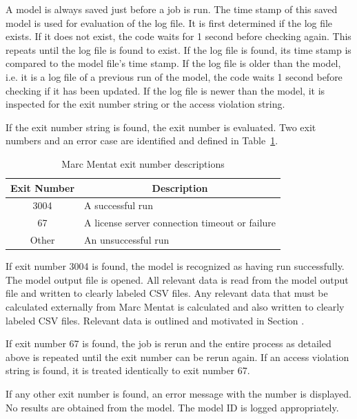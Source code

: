 A model is always saved just before a job is run. The time stamp of this saved model is used for evaluation of the log file. It is first determined if the log file exists. If it does not exist, the code waits for 1 second before checking again. This repeats until the log file is found to exist. If the log file is found, its time stamp is compared to the model file's time stamp. If the log file is older than the model, i.e. it is a log file of a previous run of the model, the code waits 1 second before checking if it has been updated. If the log file is newer than the model, it is inspected for the exit number string or the access violation string.

If the exit number string is found, the exit number is evaluated. Two exit numbers and an error case are identified and defined in Table~\ref{tab:exno}.

\begin{table}[H]
\centering
\begin{tabular}{@{}cl@{}}
\toprule
\textbf{Exit Number} & \multicolumn{1}{c}{\textbf{Description}}       \\ \midrule
3004                 & A successful run                               \\
67                   & A license server connection timeout or failure \\
Other                & An unsuccessful run                            \\ \bottomrule
\end{tabular}
\caption{Marc Mentat exit number descriptions}
\label{tab:exno}
\end{table}

If exit number 3004 is found, the model is recognized as having run successfully. The model output file is opened. All relevant data is read from the model output file and written to clearly labeled CSV files. Any relevant data that must be calculated externally from Marc Mentat is calculated and also written to clearly labeled CSV files. Relevant data is outlined and motivated in Section .

If exit number 67 is found, the job is rerun and the entire process as detailed above is repeated until the exit number can be rerun again. If an access violation string is found, it is treated identically to exit number 67.

If any other exit number is found, an error message with the number is displayed. No results are obtained from the model. The model ID is logged appropriately.

